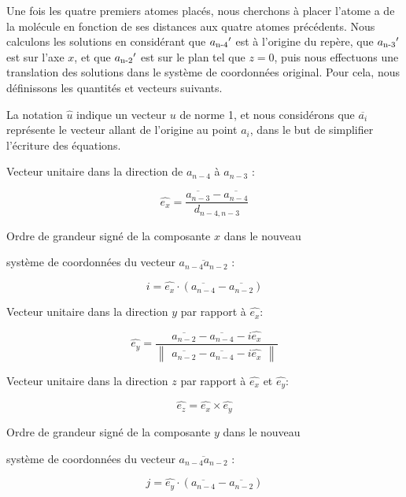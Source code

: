\par Une fois les quatre premiers atomes placés, nous cherchons à placer l'atome a de la molécule en fonction de ses distances aux quatre atomes précédents. Nous calculons les solutions en considérant que $a\textsubscript{n-4}'$ est à l'origine du repère, que $a\textsubscript{n-3}'$ est sur l'axe $x$, et que $a\textsubscript{n-2}'$ est sur le plan tel que $z=0$, puis nous effectuons une translation des solutions dans le système de coordonnées original. Pour cela, nous définissons les quantités et vecteurs suivants. 
\par La notation $\hat{u}$ indique un vecteur $u$ de norme 1, et nous considérons que $\overline{a_i}$ représente le vecteur allant de l'origine au point $a_i$, dans le but de simplifier l'écriture des équations.\\

\vspace{0.4cm}

\centerline{Vecteur unitaire dans la direction de $a_{n-4}$ à $a_{n-3}$ :}

\[
\hat{e_x} = \frac{\overline{a_{n-3}}-\overline{a_{n-4}}}{d_{n-4,n-3}}
\]

\vspace{0.4cm}

\centerline{Ordre de grandeur signé de la composante $x$ dans le nouveau}
\centerline{ système de coordonnées du vecteur $\overline{a_{n-4}a_{n-2}}$ : }
\[
i = \hat{e_x}\cdot(\overline{a_{n-4}}-\overline{a_{n-2}})
\]

\vspace{0.4cm}

\centerline{Vecteur unitaire dans la direction $y$ par rapport à $\hat{e_x}$:}
\[
\hat{e_y} = \frac{\overline{a_{n-2}}-\overline{a_{n-4}}-i\hat{e_x}}{\begin{Vmatrix}\overline{a_{n-2}}-\overline{a_{n-4}}-i\hat{e_x}\end{Vmatrix}}
\]

\vspace{0.4cm}

\centerline{Vecteur unitaire dans la direction $z$ par rapport à $\hat{e_x}$ et $\hat{e_y}$:}
\[
\hat{e_z} = \hat{e_x}\times\hat{e_y}
\]

\vspace{0.4cm}

\centerline{Ordre de grandeur signé de la composante $y$ dans le nouveau}
\centerline{ système de coordonnées du vecteur $\overline{a_{n-4}a_{n-2}}$ : }
\[
j = \hat{e_y}\cdot(\overline{a_{n-4}}-\overline{a_{n-2}})
\]

